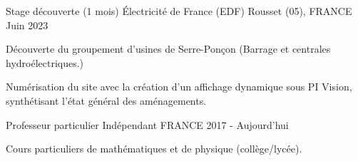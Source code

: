 

\begin{cventries}

  \cventry
    {Stage découverte (1 mois)} %
    {Électricité de France (EDF)} %
    {Rousset (05), FRANCE} %
    {Juin 2023} %
    {
      \begin{cvitems} %
        \item{Découverte du groupement d'usines de Serre-Ponçon (Barrage et centrales hydroélectriques.)}
        \item{Numérisation du site avec la création d'un affichage dynamique sous PI Vision, synthétisant l'état général des aménagements.}
      \end{cvitems}
    }

  \cventry
    {Professeur particulier} %
    {Indépendant} %
    {FRANCE} %
    {2017 - Aujourd'hui} %
    {
      \begin{cvitems} %
        \item{Cours particuliers de mathématiques et de physique (collège/lycée).}
      \end{cvitems}
    }
    

\end{cventries}
